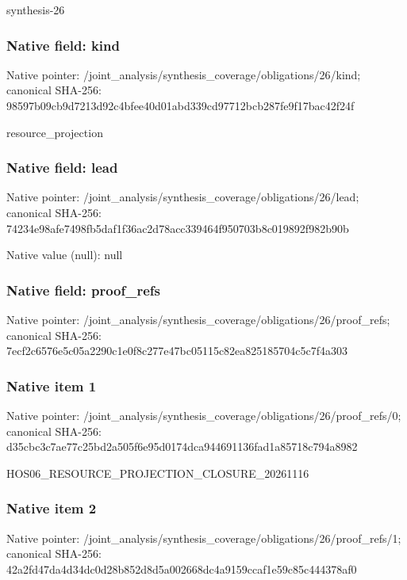 \documentclass[10pt,a4paper]{article}
\begin{document}
\begingroup\raggedright\sloppy synthesis-26\par\endgroup

\subsubsection{Native field: kind}
Native pointer: /joint\_\allowbreak{}analysis/synthesis\_\allowbreak{}coverage/obligations/26/kind; canonical SHA-256: 98597b09cb9d7213d92c4bfee40d01abd339cd97712bcb287fe9f17bac42f24f

\begingroup\raggedright\sloppy resource\_\allowbreak{}projection\par\endgroup

\subsubsection{Native field: lead}
Native pointer: /joint\_\allowbreak{}analysis/synthesis\_\allowbreak{}coverage/obligations/26/lead; canonical SHA-256: 74234e98afe7498fb5daf1f36ac2d78acc339464f950703b8c019892f982b90b

Native value (null): null

\subsubsection{Native field: proof\_\allowbreak{}refs}
Native pointer: /joint\_\allowbreak{}analysis/synthesis\_\allowbreak{}coverage/obligations/26/proof\_\allowbreak{}refs; canonical SHA-256: 7ecf2c6576e5c05a2290c1e0f8c277e47bc05115c82ea825185704c5c7f4a303

\subsubsection{Native item 1}
Native pointer: /joint\_\allowbreak{}analysis/synthesis\_\allowbreak{}coverage/obligations/26/proof\_\allowbreak{}refs/0; canonical SHA-256: d35cbc3c7ae77c25bd2a505f6e95d0174dca944691136fad1a85718c794a8982

\begingroup\raggedright\sloppy HOS06\_\allowbreak{}RESOURCE\_\allowbreak{}PROJECTION\_\allowbreak{}CLOSURE\_\allowbreak{}20261116\par\endgroup

\subsubsection{Native item 2}
Native pointer: /joint\_\allowbreak{}analysis/synthesis\_\allowbreak{}coverage/obligations/26/proof\_\allowbreak{}refs/1; canonical SHA-256: 42a2fd47da4d34dc0d28b852d8d5a002668dc4a9159ccaf1e59c85c444378af0
\end{document}
